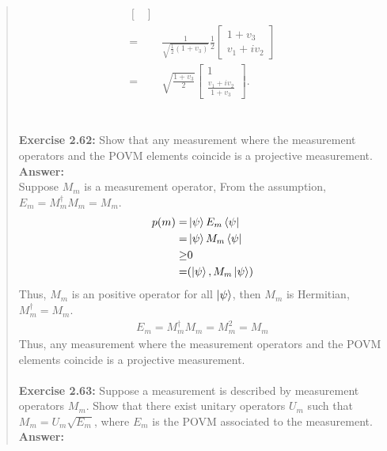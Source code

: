 \documentclass[UTF8]{ctexart}
\begin{document}
\begin{quote}
\begin{equation}
\begin{aligned}
\begin{bmatrix}
		\end{bmatrix}\\
		=&\frac{1}{\sqrt{\frac{1}{2}(1+v_{3})}}\frac{1}{2}
		\begin{bmatrix}
			1+v_{3} \\v_{1}+iv_{2}
		\end{bmatrix} \\
		=&\sqrt{\frac{1+v_{3}}{2}}\begin{bmatrix}
			1 \\ \frac{v_{1}+iv_{2}}{1+v_{3}}
		\end{bmatrix}.
	\end{aligned}
\end{equation}
\\
\\
\textbf{Exercise 2.62:  } Show that any measurement where the measurement operators and the
POVM elements coincide is a projective measurement.
\\
\textbf{Answer:}\\
Suppose $M_{m}$ is a measurement operator, From the assumption, 
$E_{m}=M_{m}^{\dagger}M_{m}=M_{m}$.\\
\begin{equation}
	\begin{aligned}
		p(m)=&\ket{\psi}E_{m}\bra{\psi}\\
			=&\ket{\psi}M_{m}\bra{\psi} \\
			\geq&0 \\
			=&(\ket{\psi},M_{m}\ket{\psi})
	\end{aligned}
\end{equation}
Thus, $M_{m}$ is an positive operator for all $\ket{\psi}$, then $M_{m}$
 is Hermitian, $M_{m}^{\dagger}=M_{m}$.\\
 \begin{equation}
	\begin{aligned}
		E_{m}=M_{m}^{\dagger}M_{m}=M_{m}^{2}=M_{m}	
	\end{aligned}
\end{equation}
Thus, any measurement where the measurement operators and the
POVM elements coincide is a projective measurement.
\\
\\
\textbf{Exercise 2.63:} Suppose a measurement is described by measurement operators $M_{m}$.
Show that there exist unitary operators $U_{m}$ such that $M_{m} = U_{m}\sqrt{E_{m}}$, where
   $E_{m}$ is the POVM associated to the measurement.
   \\
\textbf{Answer:}\\

\end{quote}
\end{document}
